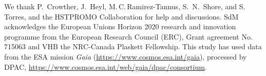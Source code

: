 \documentclass[a4paper,fleqn,usenatbib]{mnras}
\begin{document}
  
  
  {   \tiny
    We thank P.~Crowther, J.~Heyl, M.\,C.\,Ramirez-Tannus, S.~N.~Shore,
    and S.\,Torres, and the HSTPROMO Collaboration
    for help and discussions. SdM acknowledges
    the European Unions Horizon 2020 research and innovation programme
    from the European Research Council (ERC), Grant agreement No. 715063
    and VHB the NRC-Canada Plaskett Fellowship. This study has used data from the ESA mission {\it Gaia} (\url{https://www.cosmos.esa.int/gaia}), processed by %
    DPAC, \url{https://www.cosmos.esa.int/web/gaia/dpac/consortium}.
  }
\end{document}
